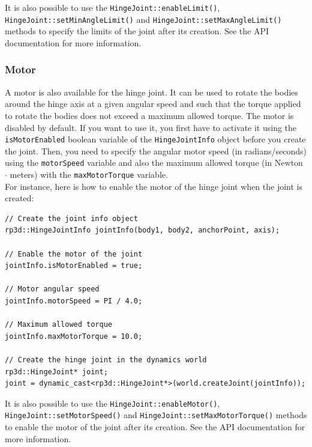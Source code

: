 \documentclass[a4paper,12pt]{article}
\begin{document}
     \vspace{0.6cm}

     \begin{sloppypar}
        It is also possible to use the \texttt{HingeJoint::enableLimit()}, \texttt{HingeJoint::setMinAngleLimit()} and \texttt{HingeJoint::setMaxAngleLimit()} methods to specify
        the limits of the joint after its creation. See the API documentation for more information.
     \end{sloppypar}

     \subsubsection{Motor}

     A motor is also available for the hinge joint. It can be used to rotate the bodies around the hinge axis at a given angular speed and such that the torque applied to
     rotate the bodies does not exceed a maximum allowed torque. The motor is disabled by default. If you want to use it, you first have to activate it using the
     \texttt{isMotorEnabled} boolean variable of the \texttt{HingeJointInfo} object before you create the joint. Then, you need to specify the angular motor speed (in radians/seconds)
     using the \texttt{motorSpeed} variable and also the maximum allowed torque (in Newton $\cdot$ meters) with the \texttt{maxMotorTorque} variable. \\

     For instance, here is how to enable the motor of the hinge joint when the joint is created: \\

     \begin{lstlisting}
// Create the joint info object
rp3d::HingeJointInfo jointInfo(body1, body2, anchorPoint, axis);

// Enable the motor of the joint
jointInfo.isMotorEnabled = true;

// Motor angular speed
jointInfo.motorSpeed = PI / 4.0;

// Maximum allowed torque
jointInfo.maxMotorTorque = 10.0;

// Create the hinge joint in the dynamics world
rp3d::HingeJoint* joint;
joint = dynamic_cast<rp3d::HingeJoint*>(world.createJoint(jointInfo));
  \end{lstlisting}

     \vspace{0.6cm}

     \begin{sloppypar}
        It is also possible to use the \texttt{HingeJoint::enableMotor()}, \texttt{HingeJoint::setMotorSpeed()} and \texttt{HingeJoint::setMaxMotorTorque()} methods to
        enable the motor of the joint after its creation. See the API documentation for more information.
     \end{sloppypar}
\end{document}

